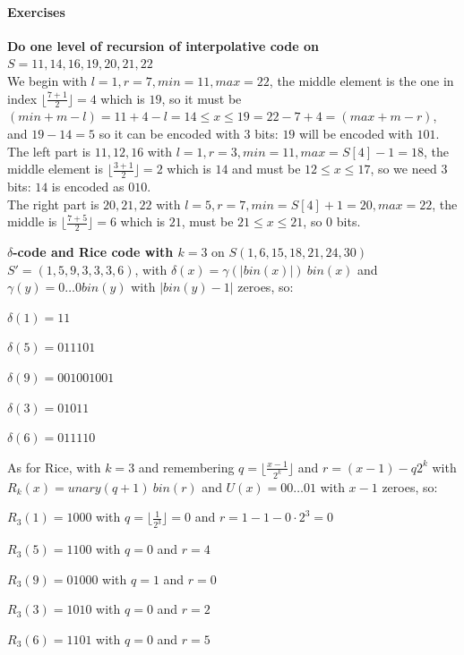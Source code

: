 \documentclass[10pt]{report}
\begin{document}
\paragraph{Exercises}
\begin{list}{}{}
	\item \textbf{Do one level of recursion of interpolative code on} $S = 11,14,16,19,20,21,22$\\
	We begin with $l=1,r=7,min=11,max=22$, the middle element is the one in index $\lfloor\frac{7+1}{2}\rfloor = 4$ which is $19$, so it must be $(min+m-l) = 11+4-l = 14 \leq x \leq 19 = 22-7+4 = (max+m-r)$, and $19-14 = 5$ so it can be encoded with 3 bits: $19$ will be encoded with $101$.\\
	The left part is $11,12,16$ with $l=1, r = 3, min = 11, max = S[4]-1 = 18$, the middle element is $\lfloor \frac{3+1}{2}\rfloor = 2$ which is $14$ and must be $12\leq x\leq 17$, so we need $3$ bits: $14$ is encoded as $010$.\\
	The right part is $20,21,22$ with $l=5, r = 7, min = S[4]+1 = 20, max = 22$, the middle is $\lfloor \frac{7+5}{2}\rfloor = 6$ which is $21$, must be $21\leq x \leq 21$, so 0 bits. 
	\item \textbf{$\delta$-code and Rice code with $k=3$} on $S(1,6,15,18,21,24,30)$\\
	$S'=(1,5,9,3,3,3,6)$, with $\delta(x) = \gamma(|bin(x)|)\:bin(x)$ and $\gamma(y)=0\ldots0 bin(y)$ with $|bin(y)-1|$ zeroes, so:\begin{list}{}{}
		\item $\delta(1) = 11$
		\item $\delta(5) = 011101$
		\item $\delta(9) = 001001001$
		\item $\delta(3) = 01011$
		\item $\delta(6) = 011110$
	\end{list}
	As for Rice, with $k=3$ and remembering $q = \lfloor\frac{x-1}{2^k}\rfloor$ and $r = (x-1) - q2^k$ with $R_k(x) = unary(q+1)\:bin(r)$ and $U(x)=00\ldots01$ with $x-1$ zeroes, so:
	\begin{list}{}{}
		\item $R_3(1) = 1000$ with $q = \lfloor\frac{1}{2^3}\rfloor = 0$ and $r = 1-1 -0\cdot2^3 = 0$
		\item $R_3(5) = 1100$ with $q = 0$ and $r = 4$
		\item $R_3(9) = 01000$ with $q = 1$ and $r = 0$
		\item $R_3(3) = 1010$ with $q = 0$ and $r = 2$
		\item $R_3(6) = 1101$ with $q = 0$ and $r = 5$

\end{list}
\end{list}
\end{document}
